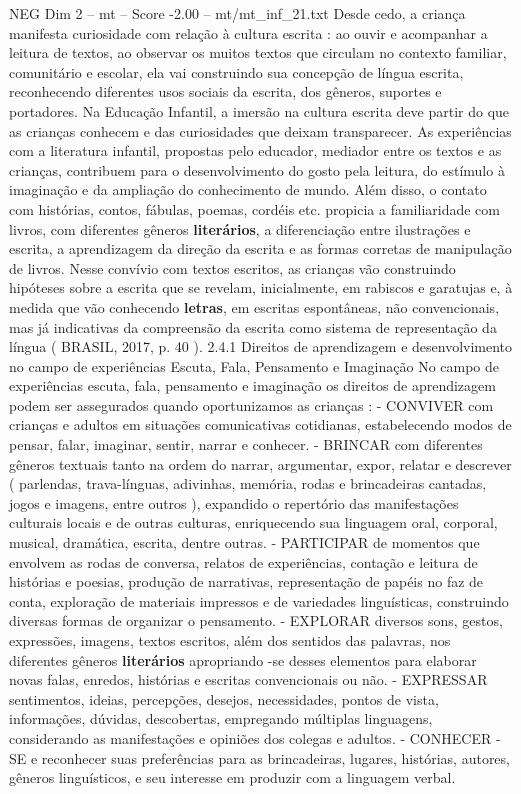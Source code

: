\begin{textsample}{NEG Dim 2 – mt – Score -2.00 – mt/mt\_inf\_21.txt}
Desde cedo, a criança manifesta curiosidade com relação à cultura escrita : ao ouvir e acompanhar a leitura de textos, ao observar os muitos textos que circulam no contexto familiar, comunitário e escolar, ela vai construindo sua concepção de língua escrita, reconhecendo diferentes usos sociais da escrita, dos gêneros, suportes e portadores.
Na Educação Infantil, a imersão na cultura escrita deve partir do que as crianças conhecem e das curiosidades que deixam transparecer.
As experiências com a literatura infantil, propostas pelo educador, mediador entre os textos e as crianças, contribuem para o desenvolvimento do gosto pela leitura, do estímulo à imaginação e da ampliação do conhecimento de mundo.
Além disso, o contato com histórias, contos, fábulas, poemas, cordéis etc. propicia a familiaridade com livros, com diferentes gêneros \textbf{literários}, a diferenciação entre ilustrações e escrita, a aprendizagem da direção da escrita e as formas corretas de manipulação de livros.
Nesse convívio com textos escritos, as crianças vão construindo hipóteses sobre a escrita que se revelam, inicialmente, em rabiscos e garatujas e, à medida que vão conhecendo \textbf{letras}, em escritas espontâneas, não convencionais, mas já indicativas da compreensão da escrita como sistema de representação da língua ( BRASIL, 2017, p. 40 ). 2.4.1 Direitos de aprendizagem e desenvolvimento no campo de experiências Escuta, Fala, Pensamento e Imaginação No campo de experiências escuta, fala, pensamento e imaginação os direitos de aprendizagem podem ser assegurados quando oportunizamos as crianças : - CONVIVER com crianças e adultos em situações comunicativas cotidianas, estabelecendo modos de pensar, falar, imaginar, sentir, narrar e conhecer. - BRINCAR com diferentes gêneros textuais tanto na ordem do narrar, argumentar, expor, relatar e descrever ( parlendas, trava-línguas, adivinhas, memória, rodas e brincadeiras cantadas, jogos e imagens, entre outros ), expandido o repertório das manifestações culturais locais e de outras culturas, enriquecendo sua linguagem oral, corporal, musical, dramática, escrita, dentre outras. - PARTICIPAR de momentos que envolvem as rodas de conversa, relatos de experiências, contação e leitura de histórias e poesias, produção de narrativas, representação de papéis no faz de conta, exploração de materiais impressos e de variedades linguísticas, construindo diversas formas de organizar o pensamento. - EXPLORAR diversos sons, gestos, expressões, imagens, textos escritos, além dos sentidos das palavras, nos diferentes gêneros \textbf{literários} apropriando -se desses elementos para elaborar novas falas, enredos, histórias e escritas convencionais ou não. - EXPRESSAR sentimentos, ideias, percepções, desejos, necessidades, pontos de vista, informações, dúvidas, descobertas, empregando múltiplas linguagens, considerando as manifestações e opiniões dos colegas e adultos. - CONHECER -SE e reconhecer suas preferências para as brincadeiras, lugares, histórias, autores, gêneros linguísticos, e seu interesse em produzir com a linguagem verbal.

\end{textsample}
